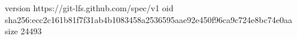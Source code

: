 version https://git-lfs.github.com/spec/v1
oid sha256:ecc2c161b81f7f31ab4b1083458a2536595aae92e450f96ca9c724e8bc74e0aa
size 24493
